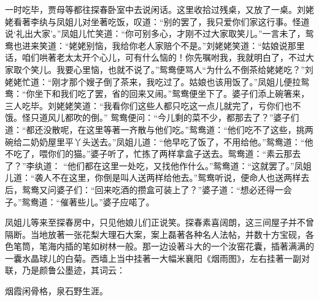 \begin{parag}
    一时吃毕，贾母等都往探春卧室中去说闲话。这里收拾过残桌，又放了一桌。刘姥姥看著李纨与凤姐儿对坐著吃饭，叹道：“别的罢了，我只爱你们家这行事。怪道说‘礼出大家’。”凤姐儿忙笑道：“你可别多心，才刚不过大家取笑儿。”一言未了，鸳鸯也进来笑道：“姥姥别恼，我给你老人家赔个不是。”刘姥姥笑道：“姑娘说那里话，咱们哄著老太太开个心儿，可有什么恼的！你先嘱咐我，我就明白了，不过大家取个笑儿。我要心里恼，也就不说了。”鸳鸯便骂人“为什么不倒茶给姥姥吃？”刘姥姥忙道：“刚才那个嫂子倒了茶来，我吃过了。姑娘也该用饭了。”凤姐儿便拉鸳鸯：“你坐下和我们吃了罢，省的回来又闹。”鸳鸯便坐下了。婆子们添上碗箸来，三人吃毕。刘姥姥笑道：“我看你们这些人都只吃这一点儿就完了，亏你们也不饿。怪只道风儿都吹的倒。” 鸳鸯便问：“今儿剩的菜不少，都那去了？”婆子们道：“都还没散呢，在这里等著一齐散与他们吃。”鸳鸯道：“他们吃不了这些，挑两碗给二奶奶屋里平丫头送去。”凤姐儿道：“他早吃了饭了，不用给他。”鸳鸯道：“他不吃了，喂你们的猫。”婆子听了，忙拣了两样拿盒子送去。鸳鸯道：“素云那去了？”李纨道： “他们都在这里一处吃，又找他作什么。”鸳鸯道：“这就罢了。”凤姐儿道：“袭人不在这里，你倒是叫人送两样给他去。”鸳鸯听说，便命人也送两样去后，鸳鸯又问婆子们：“回来吃酒的攒盒可装上了？”婆子道：“想必还得一会子。”鸳鸯道：“催著些儿。”婆子应喏了。
\end{parag}


\begin{parag}
    凤姐儿等来至探春房中，只见他娘儿们正说笑。探春素喜阔朗，这三间屋子并不曾隔断。当地放著一张花梨大理石大案，案上磊著各种名人法帖，并数十方宝砚，各色笔筒，笔海内插的笔如树林一般。那一边设著斗大的一个汝窑花囊，插著满满的一囊水晶球儿的白菊。西墙上当中挂著一大幅米襄阳《烟雨图》，左右挂著一副对联，乃是颜鲁公墨迹，其词云：
\end{parag}


\begin{poem}
    \begin{pl}
        烟霞闲骨格，泉石野生涯。\end{pl}
\end{poem}

